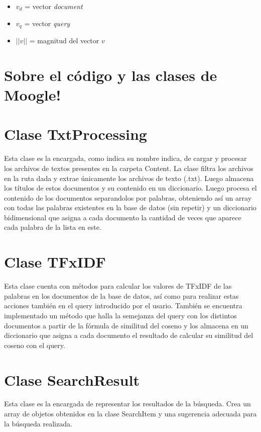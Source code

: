\documentclass{article}
\begin{document}
\begin{center}
\begin{itemize}
	\item $v_d$ = vector {\it document}
	\item $v_q$ = vector {\it query}
	\item $||v||$ = magnitud del vector $v$
\end{itemize}



\newpage

\section*{\textcolor{graphcolor}{{\centering Sobre el código y las clases de Moogle!}}}

\section*{\textcolor{graphcolor}{{\centering Clase TxtProcessing}}}

Esta clase es la encargada,  como indica su nombre indica, de cargar y procesar los archivos de textos presentes en la carpeta Content. 
La clase filtra los archivos en la ruta dada y extrae únicamente los archivos de texto (.txt). Luego almacena los títulos de estos documentos y su contenido en un diccionario. Luego procesa el contenido de los documentos separandolos por palabras, obteniendo así un array con todas las palabras existentes en la base de datos (sin repetir) y un diccionario bidimensional que asigna a cada documento la cantidad de veces que aparece cada palabra de la lista en este. 

\section*{\textcolor{graphcolor}{{\centering Clase TFxIDF}}}

Esta clase cuenta con métodos para calcular los valores de TFxIDF de las palabras en los documentos de la base de datos, así como para realizar estas acciones también en el query introducido por el usario. También se encuentra implementado un método que halla la semejanza del query con los distintos documentos a partir de la fórmula de similitud del coseno y los almacena en un diccionario que asigna a cada documento el resultado de calcular su similitud del coseno con el query.


\section*{\textcolor{graphcolor}{{\centering Clase SearchResult}}}
Esta clase es la encargada de representar los resultados de la búsqueda. Crea un array de objetos obtenidos en la clase SearchItem y una sugerencia adecuada para la búsqueda realizada.


\end{center}
\end{document}
